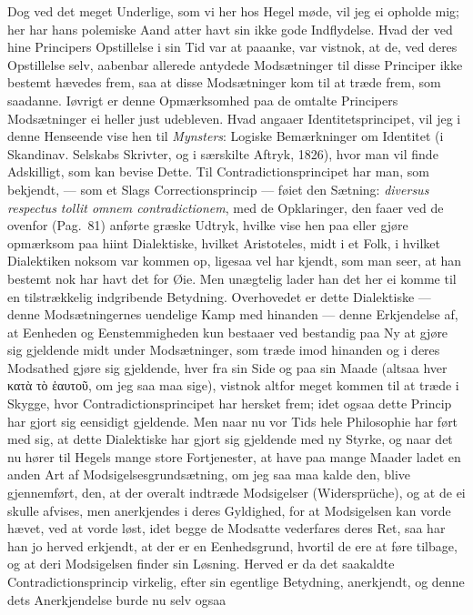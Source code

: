 \documentclass[12pt,a4paper]{book}
\newcommand{\apage}[1]{\marginnote{\footnotesize\textit{[#1]}}}
\begin{document}
Dog ved det meget Underlige, som vi her hos Hegel møde, vil jeg ei opholde
mig; her har hans polemiske Aand atter havt sin ikke gode Indflydelse. Hvad
der ved hine Principers Opstillelse i sin Tid var at paaanke, var vistnok,
at de, ved deres Opstillelse selv, aabenbar allerede antydede Modsætninger
til disse Principer ikke bestemt hævedes frem, saa at disse Modsætninger
kom til at træde frem, som saadanne. Iøvrigt er denne Opmærksomhed paa de
omtalte Principers Modsætninger ei heller just udebleven. Hvad angaaer
Identitetsprincipet, vil jeg i denne Henseende vise hen til \emph{Mynsters}:
Logiske Bemærkninger om Identitet (i Skandinav. Selskabs Skrivter, og i
særskilte Aftryk, 1826), hvor man vil finde Adskilligt, som kan bevise
Dette. Til Contradictionsprincipet har man, som bekjendt, --- som et Slags
Correctionsprincip --- føiet den Sætning: \textit{diversus respectus tollit
omnem contradictionem}, med de Opklaringer, den faaer ved \apage{85} de ovenfor
(Pag.\ 81) anførte græske Udtryk, hvilke vise hen paa eller gjøre
opmærksom paa hiint Dialektiske, hvilket Aristoteles, midt i et Folk, i
hvilket Dialektiken noksom var kommen op, ligesaa vel har kjendt, som man
seer, at han bestemt nok har havt det for Øie. Men unægtelig lader han det
her ei komme til en tilstrækkelig indgribende Betydning. Overhovedet er
dette Dialektiske --- denne Modsætningernes uendelige Kamp med hinanden ---
denne Erkjendelse af, at Eenheden og Eenstemmigheden kun bestaaer ved
bestandig paa Ny at gjøre sig gjeldende midt under Modsætninger, som træde
imod hinanden og i deres Modsathed gjøre sig gjeldende, hver fra sin Side
og paa sin Maade (altsaa hver κατὰ τὸ ἑαυτοῦ, om jeg saa maa sige), vistnok
altfor meget kommen til at træde i Skygge, hvor Contradictionsprincipet har
hersket frem; idet ogsaa dette Princip har gjort sig eensidigt gjeldende.
Men naar nu vor Tids hele Philosophie har ført med sig, at dette
Dialektiske har gjort sig gjeldende med ny Styrke, og naar det nu hører til
Hegels mange store Fortjenester, at have paa mange Maader ladet en anden
Art af Modsigelsesgrundsætning, om jeg saa maa kalde den, blive
gjennemført, den, at der overalt indtræde Modsigelser (Widersprüche), og at
de ei skulle afvises, men anerkjendes i deres Gyldighed, for at Modsigelsen
kan vorde hævet, ved at vorde løst, idet begge de Modsatte vederfares deres
Ret, saa har han jo herved erkjendt, at der er en Eenhedsgrund, hvortil de
ere at føre tilbage, og at deri Modsigelsen finder sin Løsning. Herved er
da det saakaldte Contradictionsprincip virkelig, efter sin egentlige
Betydning, anerkjendt, og denne dets Anerkjendelse burde nu selv ogsaa
\end{document}
